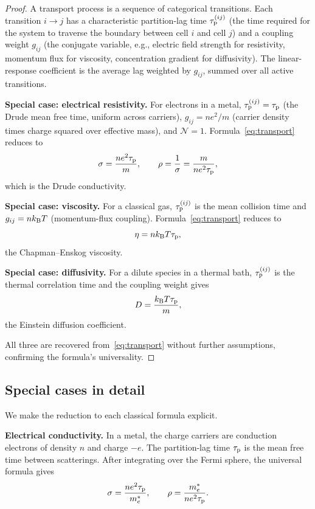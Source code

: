 \begin{proof}
A transport process is a sequence of categorical transitions.  Each
transition $i \to j$ has a characteristic partition-lag time
$\tau_{\mathrm{p}}^{(ij)}$ (the time required for the system to traverse the boundary
between cell $i$ and cell $j$) and a coupling weight $g_{ij}$ (the
conjugate variable, e.g., electric field strength for resistivity,
momentum flux for viscosity, concentration gradient for diffusivity).
The linear-response coefficient is the average lag weighted by $g_{ij}$,
summed over all active transitions.

\medskip
\noindent\textbf{Special case: electrical resistivity.}
For electrons in a metal, $\tau_{\mathrm{p}}^{(ij)} = \tau_{\mathrm{p}}$ (the Drude mean free
time, uniform across carriers), $g_{ij} = ne^2/m$ (carrier density times
charge squared over effective mass), and $\mathcal{N} = 1$.
Formula~\eqref{eq:transport} reduces to
\[
  \sigma = \frac{ne^2 \tau_{\mathrm{p}}}{m},
  \qquad
  \rho = \frac{1}{\sigma} = \frac{m}{ne^2\tau_{\mathrm{p}}},
\]
which is the Drude conductivity.

\medskip
\noindent\textbf{Special case: viscosity.}
For a classical gas, $\tau_{\mathrm{p}}^{(ij)}$ is the mean collision time and
$g_{ij} = nk_{\mathrm{B}} T$ (momentum-flux coupling).
Formula~\eqref{eq:transport} reduces to
\[
  \eta = nk_{\mathrm{B}} T \tau_{\mathrm{p}},
\]
the Chapman--Enskog viscosity.

\medskip
\noindent\textbf{Special case: diffusivity.}
For a dilute species in a thermal bath, $\tau_{\mathrm{p}}^{(ij)}$ is the thermal
correlation time and the coupling weight gives
\[
  D = \frac{k_{\mathrm{B}} T \tau_{\mathrm{p}}}{m},
\]
the Einstein diffusion coefficient.

All three are recovered from~\eqref{eq:transport} without further
assumptions, confirming the formula's universality.
\end{proof}

\subsection{Special cases in detail}

We make the reduction to each classical formula explicit.

\medskip
\noindent\textbf{Electrical conductivity.}
In a metal, the charge carriers are conduction electrons of density $n$
and charge $-e$.  The partition-lag time $\tau_{\mathrm{p}}$ is the mean free time
between scatterings.  After integrating over the Fermi sphere, the
universal formula gives
\begin{equation}
  \sigma = \frac{ne^2\tau_{\mathrm{p}}}{m_e^*},
  \qquad
  \rho = \frac{m_e^*}{ne^2\tau_{\mathrm{p}}}.
  \label{eq:sigma}
\end{equation}

